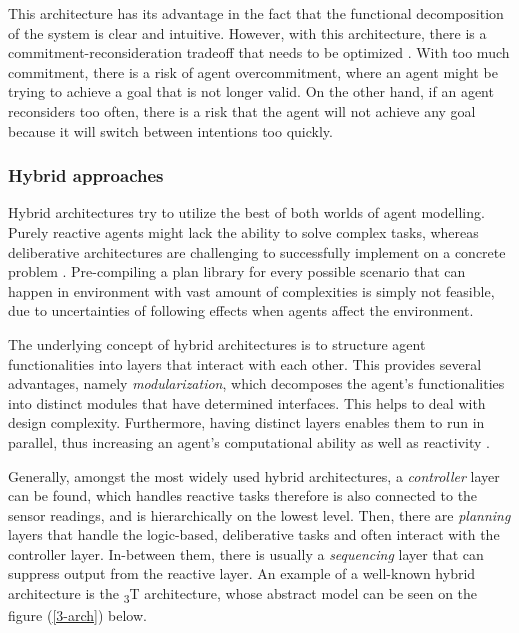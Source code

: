 \documentclass[main.tex]{subfiles}
\begin{document}
This architecture has its advantage in the fact that the functional decomposition of the system
is clear and intuitive. However, with this architecture, there is a commitment-reconsideration
tradeoff that needs to be optimized \cite{Wooldridge1999}. With too much commitment, there is a
risk of agent overcommitment, where an agent might be trying to achieve a goal that is not
longer valid. On the other hand, if an agent reconsiders too often, there is a risk that the
agent will not achieve any goal because it will switch between intentions too quickly.

\subsubsection{Hybrid approaches}\label{hybrid-arch}

Hybrid architectures try to utilize the best of both worlds of agent modelling. Purely reactive 
agents might lack the ability to solve complex tasks, whereas deliberative architectures are 
challenging to successfully implement on a concrete problem \cite{Anthony2014}. Pre-compiling a plan
library for every possible scenario that can happen in environment with vast amount of complexities
is simply not feasible, due to uncertainties of following effects when agents 
affect the environment. 

The underlying concept of hybrid architectures is to structure agent functionalities into layers 
that interact with each other. This provides several advantages, namely \emph{modularization},
which decomposes the agent's functionalities into distinct modules that have determined 
interfaces. This helps to deal with design complexity. Furthermore, having distinct layers enables 
them to run in parallel, thus increasing an agent's computational ability as well as reactivity
\cite{Mueller1999}.

Generally, amongst the most widely used hybrid architectures, a \emph{controller} layer can be
found, which handles reactive tasks therefore is also connected to the sensor readings, and is 
hierarchically on the lowest level. Then, there are \emph{planning} layers that handle the
logic-based, deliberative tasks and often interact with the controller layer. In-between them, 
there is usually a \emph{sequencing} layer that can suppress output from the reactive layer. 
An example of a well-known hybrid architecture is the \textsubscript{3}T architecture, whose 
abstract model can be seen on the figure (\ref{3-arch}) below.
\end{document}

